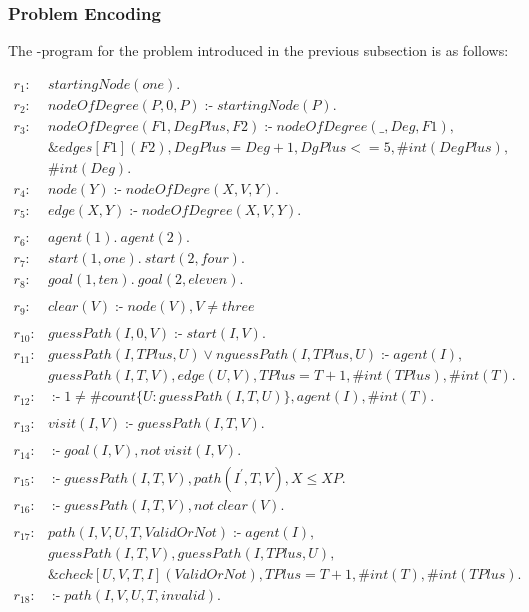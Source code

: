 \documentclass[a4paper, titlepage]{article}
\newcommand{\ext}[3]{\ensuremath{\&{#1}[#2](#3)}}
\DeclareMathOperator{\leftimpl}{:-}
\begin{document}
\subsubsection{Problem Encoding}
The \hex-program for the problem introduced in the previous 
subsection is as follows:
\begin{exmp}
\label{pathfindingAgent}
\begin{align*}
r_1 \colon & startingNode(one). \\
r_2 \colon & nodeOfDegree(P,0,P) \leftimpl startingNode(P). 
\\
r_3 \colon & nodeOfDegree(F1, DegPlus, F2) \leftimpl 
nodeOfDegree(\_, Deg, F1), \\ & \ext{edges}{F1}{F2}, 
DegPlus=Deg+1, DgPlus <= 5, \#int(DegPlus), \\ &\#int(Deg). 
\\
r_4 \colon & node(Y) \leftimpl nodeOfDegre(X, V, Y).  \\
r_5 \colon & edge(X,Y) \leftimpl nodeOfDegree(X,V,Y).\\
\\
r_6 \colon &  \mathit{agent(1). } \ \mathit{ agent(2). }\\
r_7 \colon & \mathit{start(1,one).} \ \mathit{ 
start(2,four).} \\
r_8 \colon & \mathit{goal(1,ten).} \ \mathit{ 
goal(2,eleven).} \\
\\
r_9 \colon & clear(V) \leftimpl \mathit{node(V)}, V \neq 
\mathit{three}\\ 
\\
r_{10} \colon & guessPath(I,0,V) \leftimpl start(I,V). \\
r_{11} \colon &  \mathit{guessPath(I, TPlus, U)} \vee 
\mathit{nguessPath(I, TPlus, U)} \leftimpl 
\mathit{agent(I)}, \\ &  \mathit{guessPath(I, T, V)},  
\mathit{edge(U,V)}, \mathit{TPlus=T+1}, 
\mathit{\#int(TPlus)}, \mathit{\#int(T).}  \\
r_{12} \colon &  \leftimpl 1 \neq \mathit{\#count\{ U 
\colon guessPath(I, T, U) \}}, \mathit{agent(I)}, 
\mathit{\#int(T)}.  \\
\\
r_{13} \colon &  visit(I, V) \leftimpl guessPath(I,T,V). \\
\\
r_{14} \colon & \leftimpl goal(I, V), \mathit{not} \  
\mathit{visit(I, V).} \\
r_{15} \colon &  \leftimpl guessPath(I, T, V), 
path(I^{\prime},T,V), X \leq XP. \\
r_{16} \colon &  \leftimpl guessPath(I,T,V), \mathit{not} \  
\mathit{clear(V).}\\
\\
r_{17} \colon &  \mathit{path(I,V,U,T,ValidOrNot)} 
\leftimpl \mathit{agent(I)}, \\ & \mathit{guessPath(I, T, 
V)}, \mathit{guessPath(I, TPlus, U)}, \\ & \ext{check}{U, 
V, T, I}{ValidOrNot}, \mathit{TPlus=T+1}, \#int(T), 
\#int(TPlus).  \\
r_{18} \colon & \leftimpl path(I, V, U, T, invalid). 
\end{align*}
\end{exmp}
\end{document}

